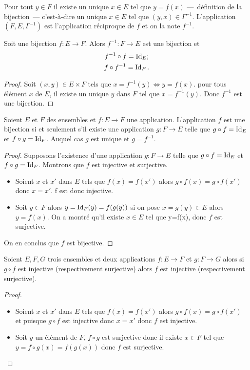 Pour tout $y \in F$ il existe un unique $x \in E$ tel que $y=f(x)$ ---~définition de la bijection~--- c'est-à-dire un unique $x \in E$ tel que $(y,x) \in \Gamma^{-1}$. L'application $(F,E,\Gamma^{-1})$ est l'application réciproque de $f$ et on la note $f^{-1}$.
%
\begin{prop} Soit une bijection $f : E \longrightarrow F$. Alors $f^{-1} : F \longrightarrow E$ est une bijection et
  \begin{gather}
    f^{-1} \circ f =\operatorname{Id}_E; \\
    f \circ f^{-1}=\operatorname{Id}_F.
  \end{gather}
\end{prop}
\begin{proof}
Soit $(x,y) \in E \times F$ tels que $x=f^{-1}(y) \iff y=f(x)$. pour tous élément $x$ de $E$, il existe un unique $y$ dans $F$ tel que $x=f^{-1}(y)$. Donc $f^{-1}$ est une bijection.
\end{proof}
%
\begin{theo}
Soient $E$ et $F$ des ensembles et $f:E \longrightarrow F$ une application. L'application $f$ est une bijection si et seulement s'il existe une application $g:F \longrightarrow E$ telle que $g \circ f = \operatorname{Id}_E$ et $f \circ g = \operatorname{Id}_F$. Auquel cas $g$ est unique et $g=f^{-1}$.
\end{theo}
\begin{proof}
  Supposons l'existence d'une application $g:F \longrightarrow E$ telle que $g \circ f = \operatorname{Id}_E$ et $f \circ g = \operatorname{Id}_F$. Montrons que $f$ est injective et surjective.
  \begin{itemize}
  \item Soient $x$ et $x'$ dans $E$ tels que $f(x)=f(x')$ alors $g \circ f(x) = g \circ f(x')$ donc $x=x'$. f est donc injective.
  \item Soit $y \in F$ alors $y=\operatorname{Id}_F(y)=f(g(y))$ si on pose $x=g(y) \in E$ alors $y=f(x)$. On a montré qu'il existe $x \in E$ tel que y=f(x), donc $f$ est surjective.
  \end{itemize}
  On en conclus que $f$ est bijective.
\end{proof}
%
\begin{prop}
  Soient $E,F,G$ trois ensembles et deux applications $f:E \longrightarrow F$ et $g:F \longrightarrow G$ alors si $g \circ f$ est injective (respectivement surjective) alors $f$ est injective (respectivement surjective).
\end{prop}
\begin{proof}
  \begin{itemize}
  \item Soient $x$ et $x'$ dans $E$ tels que $f(x)=f(x')$ alors $g \circ f(x) = g \circ f(x')$ et puisque $g \circ f$ est injective donc $x=x'$ donc $f$ est injective.
  \item Soit $y$ un élément de $F$, $f \circ g$ est surjective donc il existe $x \in F$ tel que $y=f \circ g(x)=f(g(x))$ donc $f$ est surjective.
  \end{itemize}
\end{proof}
